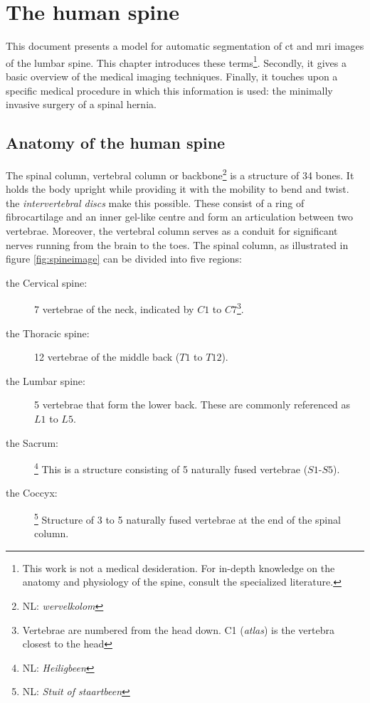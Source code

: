 \chapter{The human spine}\thispagestyle{empty}
\par{
    This document presents a model for automatic segmentation of \acrfull{ct} and \acrfull{mri} images of the lumbar spine.
    This chapter introduces these terms\footnote{This work is not a medical desideration. For in-depth knowledge on the anatomy and physiology of the spine, consult the specialized literature.}.
    Secondly, it gives a basic overview of the medical imaging techniques. 
    Finally, it touches upon a specific medical procedure in which this information is used: the minimally invasive surgery of a spinal hernia.
}
\section{Anatomy of the human spine}

\par{
    The spinal column, vertebral column or backbone\footnote{NL: \textit{wervelkolom}} is a structure of 34 bones. 
    It holds the body upright while providing it with the mobility to bend and twist.
    the \textit{intervertebral discs} make this possible. These consist of a ring of fibrocartilage and an inner gel-like centre and form an articulation between two vertebrae.
    Moreover, the vertebral column serves as a conduit for significant nerves running from the brain to the toes.
    The spinal column, as illustrated in figure \ref{fig:spineimage} can be divided into five regions:
}
\begin{description}
    \item[the Cervical spine:] 7 vertebrae of the neck, indicated by $C1$ to $C7$\footnote{Vertebrae are numbered from the head down. C1 (\textit{atlas}) is the vertebra closest to the head}.
    \item[the Thoracic spine:] 12 vertebrae of the middle back ($T1$ to $T12$).
    \item[the Lumbar spine:] 5 vertebrae that form the lower back. These are commonly referenced as $L1$ to $L5$.
    \item[the Sacrum:]\footnote{NL: \textit{Heiligbeen}} This is a structure consisting of 5 naturally fused vertebrae ($S1$-$S5$).
    \item[the Coccyx:]\footnote{NL: \textit{Stuit of staartbeen}} Structure of 3 to 5 naturally fused vertebrae at the end of the spinal column.
\end{description}


